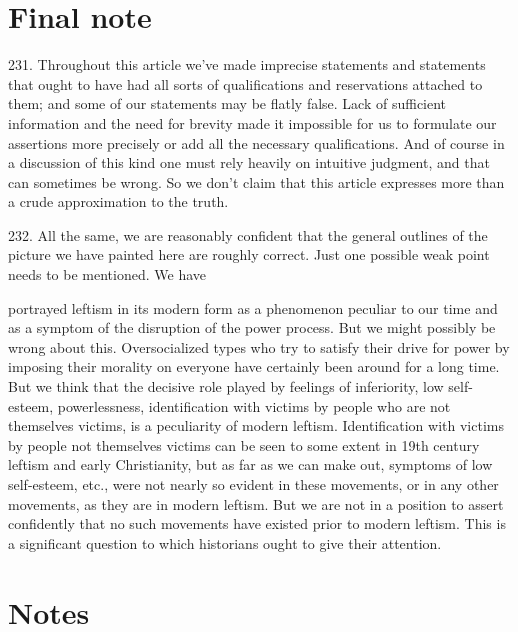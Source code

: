 \documentclass{article}
\begin{document}
\section{Final note}

\hspace{0.5cm} 231.  Throughout this article we’ve made imprecise statements and statements that ought to have 
had all sorts of qualifications and reservations attached to them; and some of our statements may 
be flatly false.  Lack of sufficient information and the need for brevity made it impossible for us 
to formulate our assertions more precisely or add all the necessary qualifications.  And of course 
in a discussion of this kind one must rely heavily on intuitive judgment, and that can sometimes 
be wrong.  So we don’t claim that this article expresses more than a crude approximation to the 
truth. \vspace{\baselineskip} 

232.  All the same, we are reasonably confident that the general outlines of the picture we have 
painted here are roughly correct.  Just one possible weak point needs to be mentioned.  We have 

portrayed leftism in its modern form as a phenomenon peculiar to our time and as a symptom of 
the disruption of the power process.  But we might possibly be wrong about this.  Oversocialized 
types who try to satisfy their drive for power by imposing their morality on everyone have certainly 
been around for a long time.  But we think that the decisive role played by feelings of inferiority, 
low  self-esteem,  powerlessness,  identification  with  victims  by  people  who  are  not  themselves
victims, is a peculiarity of modern leftism.  Identification with victims by people not themselves 
victims can be seen to some extent in 19th century leftism and early Christianity, but as far as we 
can make out, symptoms of low self-esteem, etc., were not nearly so evident in these movements, 
or in any other movements, as they are in modern leftism.  But we are not in a position to assert 
confidently  that  no  such  movements  have  existed  prior  to  modern  leftism.   This  is  a  significant  
question to which historians ought to give their attention. 

\afterpage{\null\newpage}
\newpage

\section{Notes}
\end{document}
